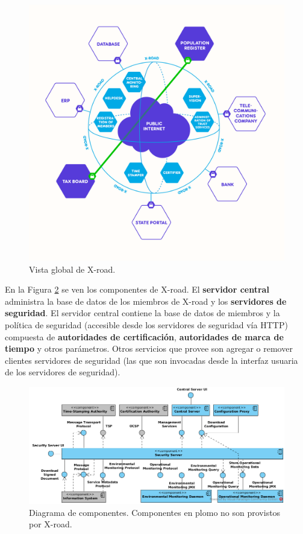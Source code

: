 \begin{figure}[h!]
    \centering
    \includegraphics[scale=0.20]{Pictures/X-Road_overview.png}
    \caption{Vista global de X-road. }
    \label{fig:X-road}
\end{figure}

En la Figura \ref{fig:DC}  se ven los componentes de X-road. El \textbf{servidor central} administra la base de datos de los miembros de X-road y los \textbf{servidores de seguridad}. El servidor central contiene la base de datos de miembros y la política de seguridad (accesible desde los servidores de seguridad vía HTTP) compuesta de \textbf{autoridades de certificación}, \textbf{autoridades de marca de tiempo} y otros parámetros. Otros servicios que provee son agregar o remover clientes servidores de seguridad (las que son invocadas desde la interfaz usuaria de los servidores de seguridad). 
\begin{figure}[h!]
    \centering
    \includegraphics[scale=0.6]{Pictures/arc-g_logical_structure_of_x_road.png}
    \caption{Diagrama de componentes. Componentes  en plomo no son provistos por X-road.}
    \label{fig:DC}
\end{figure}

